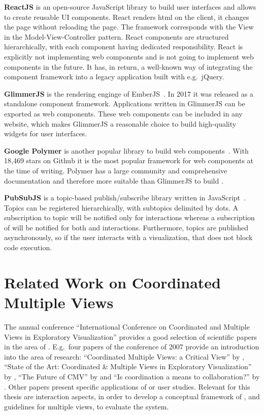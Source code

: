 \textbf{ReactJS} is an open-source JavaScript library to build user interfaces and allows to create reusable UI components.
React renders \gls{html} on the client, it changes the page without reloading the page.
The framework corresponds with the View in the Model-View-Controller pattern.
React components are structured hierarchically, with each component having dedicated responsibility.
React is explicitly not implementing web components and is not going to implement web components in the future.
It has, in return, a well-known way of integrating the component framework into a legacy application built with e.g.\ jQuery.

\textbf{GlimmerJS} is the rendering enginge of EmberJS~\parencite{Glimmer2017}.
In 2017 it was released as a standalone component framework.
Applications written in GlimmerJS can be exported as web components.
These web components can be included in any website, which makes GlimmerJS a reasonable choice to build high-quality widgets for user interfaces.

\textbf{Google Polymer} is another popular library to build web components~\parencite{Polymer2017}.
With 18,469 stars on Github it is the most popular framework for web components at the time of writing.
Polymer has a large community and comprehensive documentation and therefore more suitable than GlimmerJS to build \cmvs{}.


\textbf{PubSubJS} is a topic-based publish/subscribe library written in JavaScript~\parencite{PubSubJS2017}.
Topics can be registered hierarchically, with subtopics delimited by dots.
A subscription to topic  will be notified only for  interactions whereas a subscription of  will be notified for both  and  interactions.
Furthermore, topics are published asynchronously, so if the user interacts with a visualization, that does not block code execution.


\section{Related Work on Coordinated Multiple Views}\label{sec:related-work:guidelines}
The annual conference ``International Conference on Coordinated and Multiple Views in Exploratory Visualization'' provides a good selection of scientific papers in the area of \cmvs{}.
E.g.\ four papers of the conference of 2007 provide an introduction into the area of research:
``Coordinated Multiple Views: a Critical View'' by \textcite{Andrienko2007},
``State of the Art: Coordinated \& Multiple Views in Exploratory Visualization'' by \textcite{Roberts2007},
``The Future of CMV'' by \textcite{Erbacher2007} and
``Is coordination a means to collaboration?'' by \textcite{Weaver2007}.
Other papers present specific applications of \cmvs{} or user studies.
Relevant for this thesis are interaction aspects, in order to develop a conceptual framework of \cmvs{}, and guidelines for multiple views, to evaluate the system.

